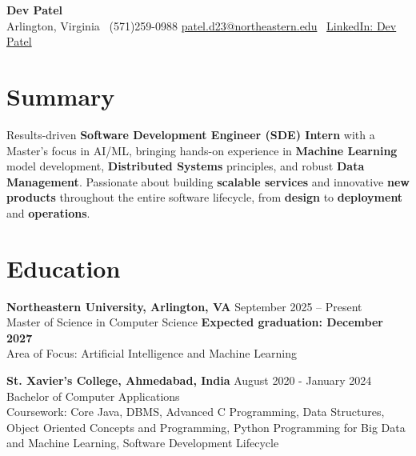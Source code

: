 \documentclass[a4paper,10pt]{article}
\begin{document}
\begin{center}
\vspace{-3mm}
    \fontsize{16}{18}\selectfont \textbf{Dev Patel} \\
    \vspace{0mm}
    \normalsize Arlington, Virginia \textbar\ (571)259-0988  \textbar       \href{mailto:patel.d23@northeastern.edu}{patel.d23@northeastern.edu} \textbar\ \href{https://www.linkedin.com/in/devxpatel//}{LinkedIn: Dev Patel} \\
\end{center}



\section*{Summary}
Results-driven \textbf{Software Development Engineer (SDE) Intern} with a Master's focus in AI/ML, bringing hands-on experience in \textbf{Machine Learning} model development, \textbf{Distributed Systems} principles, and robust \textbf{Data Management}. Passionate about building \textbf{scalable services} and innovative \textbf{new products} throughout the entire software lifecycle, from \textbf{design} to \textbf{deployment} and \textbf{operations}.
 
\vspace{ 0 mm}
\section*{Education}
\textbf{Northeastern University, Arlington, VA} \hfill September 2025 -- Present\\
Master of Science in Computer Science \hfill \textbf{Expected graduation: December 2027} \\
Area of Focus: Artificial Intelligence and Machine Learning

\vspace{1 mm} %
\textbf{St. Xavier's College, Ahmedabad, India} \hfill August 2020 - January 2024 \\
Bachelor of Computer Applications\\
Coursework: Core Java, DBMS, Advanced C Programming, Data Structures, Object Oriented Concepts and Programming, Python Programming for Big Data and Machine Learning, Software Development Lifecycle
\end{document}
